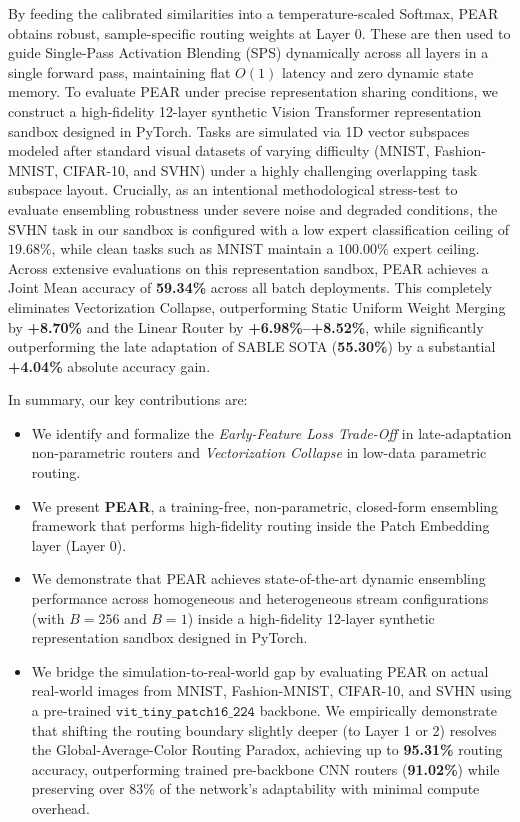 By feeding the calibrated similarities into a temperature-scaled Softmax, PEAR obtains robust, sample-specific routing weights at Layer 0. These are then used to guide Single-Pass Activation Blending (SPS) dynamically across all layers in a single forward pass, maintaining flat $O(1)$ latency and zero dynamic state memory. To evaluate PEAR under precise representation sharing conditions, we construct a high-fidelity 12-layer synthetic Vision Transformer representation sandbox designed in PyTorch. Tasks are simulated via 1D vector subspaces modeled after standard visual datasets of varying difficulty (MNIST, Fashion-MNIST, CIFAR-10, and SVHN) under a highly challenging overlapping task subspace layout. Crucially, as an intentional methodological stress-test to evaluate ensembling robustness under severe noise and degraded conditions, the SVHN task in our sandbox is configured with a low expert classification ceiling of $19.68\%$, while clean tasks such as MNIST maintain a $100.00\%$ expert ceiling. Across extensive evaluations on this representation sandbox, PEAR achieves a Joint Mean accuracy of \textbf{59.34\%} across all batch deployments. This completely eliminates Vectorization Collapse, outperforming Static Uniform Weight Merging by \textbf{+8.70\%} and the Linear Router by \textbf{+6.98\%--+8.52\%}, while significantly outperforming the late adaptation of SABLE SOTA (\textbf{55.30\%}) by a substantial \textbf{+4.04\%} absolute accuracy gain.

In summary, our key contributions are:
\begin{itemize}
    \item We identify and formalize the \emph{Early-Feature Loss Trade-Off} in late-adaptation non-parametric routers and \emph{Vectorization Collapse} in low-data parametric routing.
    \item We present \textbf{PEAR}, a training-free, non-parametric, closed-form ensembling framework that performs high-fidelity routing inside the Patch Embedding layer (Layer 0).
    \item We demonstrate that PEAR achieves state-of-the-art dynamic ensembling performance across homogeneous and heterogeneous stream configurations (with $B=256$ and $B=1$) inside a high-fidelity 12-layer synthetic representation sandbox designed in PyTorch.
    \item We bridge the simulation-to-real-world gap by evaluating PEAR on actual real-world images from MNIST, Fashion-MNIST, CIFAR-10, and SVHN using a pre-trained $\mathtt{vit\_tiny\_patch16\_224}$ backbone. We empirically demonstrate that shifting the routing boundary slightly deeper (to Layer 1 or 2) resolves the Global-Average-Color Routing Paradox, achieving up to \textbf{95.31\%} routing accuracy, outperforming trained pre-backbone CNN routers (\textbf{91.02\%}) while preserving over 83\% of the network's adaptability with minimal compute overhead.
\end{itemize}
